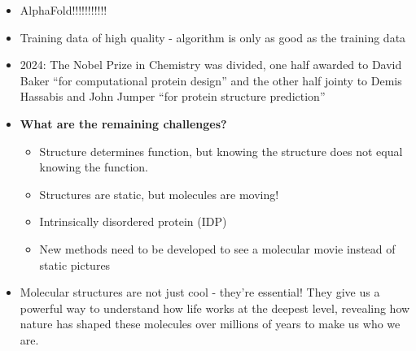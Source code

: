 \documentclass[letterpaper, 12pt]{article}
\begin{document}
\begin{itemize}
\item AlphaFold!!!!!!!!!!!
\item Training data of high quality - algorithm is only as good as the training data
\item 2024: The Nobel Prize in Chemistry was divided, one half awarded to David Baker ``for computational protein design'' and the other half jointy to Demis Hassabis and John Jumper ``for protein structure prediction''
\item \textbf{What are the remaining challenges?}
\begin{itemize}
\item Structure determines function, but knowing the structure does not equal knowing the function.
\item Structures are static, but molecules are moving!
\item Intrinsically disordered protein (IDP)
\item New methods need to be developed to see a molecular movie instead of static pictures
\end{itemize}
\item Molecular structures are not just cool - they're essential! They give us a powerful way to understand how life works at the deepest level, revealing how nature has shaped these molecules over millions of years to make us who we are.
\end{itemize}
\end{document}
